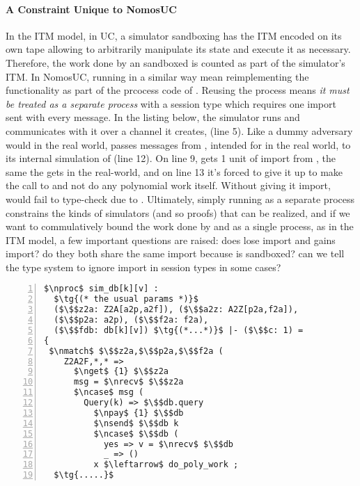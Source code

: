 \paragraph*{\textbf{A Constraint Unique to NomosUC}}
In the ITM model, in UC, a simulator sandboxing \Fdb has the ITM encoded on its own tape allowing to arbitrarily manipulate its state and execute it as necessary.
Therefore, the work done by an sandboxed \Fdb is counted as part of the simulator's ITM.
In NomosUC, running \Fdb in a similar way mean reimplementing the functionality as part of the prcocess code of \Sim. Reusing the \Fdb process means \emph{it must be treated as a separate process} 
with a session type  which requires one import sent with every message.
In the listing below, the simulator runs \Fdb and communicates with it over a channel it creates,  (line 5). 
Like a dummy adversary would in the real world, \Sim passes messages from \Z, intended for \Fdb in the real world, to its internal simulation of \Fdb (line 12).
On line 9, \Sim gets 1 unit of import from \Z, the same the \DA gets in the real-world, and on line 13 it's forced to give it up to make the call to \Fdb and not do any polynomial work itself.
Without giving it import, \Sim would fail to type-check due to .
Ultimately, simply running \Fdb as a separate process constrains the kinds of simulators (and so proofs) that can be realized, and if we want to commulatively bound the work done by \Fdb and \Sim as a single process, as in the ITM model, a few important questions are raised:
does \Sim lose import and \Fdb gains import? do they both share the same import because \Fdb is sandboxed? can we tell the type system to ignore import in session types in some cases?

\begin{lstlisting}[basicstyle=\scriptsize\BeraMonottFamily, frame=single, mathescape, numbers=left, xleftmargin=2em, xrightmargin=2em]
$\nproc$ sim_db[k][v] : 
  $\tg{(* the usual params *)}$
  ($\$$z2a: Z2A[a2p,a2f]), ($\$$a2z: A2Z[p2a,f2a]),
  ($\$$p2a: a2p), ($\$$f2a: f2a),
  ($\$$fdb: db[k][v]) $\tg{(*...*)}$ |- ($\$$c: 1) =
{
 $\nmatch$ $\$$z2a,$\$$p2a,$\$$f2a (
    Z2A2F,*,* =>
      $\nget$ {1} $\$$z2a
      msg = $\nrecv$ $\$$z2a
      $\ncase$ msg (
        Query(k) => $\$$db.query
          $\npay$ {1} $\$$db
          $\nsend$ $\$$db k
          $\ncase$ $\$$db (
            yes => v = $\nrecv$ $\$$db 
            _ => ()
          x $\leftarrow$ do_poly_work ;
  $\tg{.....}$
\end{lstlisting}

